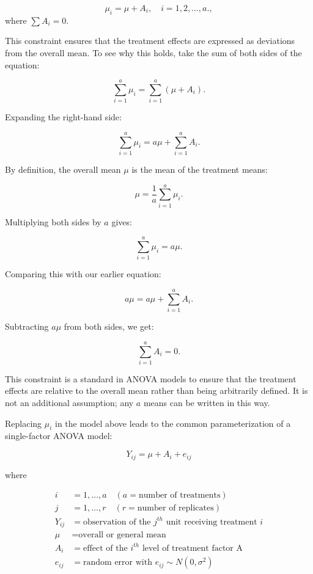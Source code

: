 \documentclass[
  letterpaper,
  DIV=11,
  numbers=noendperiod,
  oneside]{scrreprt}
\begin{document}
\[
\mu_i = \mu + A_i, \quad i = 1, 2, \dots, a.,
\] where \(\sum A_i = 0\).

\begin{tcolorbox}[enhanced jigsaw, colframe=quarto-callout-caution-color-frame, breakable, arc=.35mm, toptitle=1mm, colback=white, title={Why the \(\sum A_i = 0\) constraint?}, opacityback=0, bottomrule=.15mm, opacitybacktitle=0.6, colbacktitle=quarto-callout-caution-color!10!white, toprule=.15mm, rightrule=.15mm, bottomtitle=1mm, leftrule=.75mm, titlerule=0mm, coltitle=black, left=2mm]

This constraint ensures that the treatment effects are expressed as
deviations from the overall mean. To see why this holds, take the sum of
both sides of the equation:

\[
\sum_{i=1}^{a} \mu_i = \sum_{i=1}^{a} (\mu + A_i).
\]

Expanding the right-hand side:

\[
\sum_{i=1}^{a} \mu_i = a\mu + \sum_{i=1}^{a} A_i.
\]

By definition, the overall mean \(\mu\) is the mean of the treatment
means:

\[
\mu = \frac{1}{a} \sum_{i=1}^{a} \mu_i.
\]

Multiplying both sides by \(a\) gives:

\[
\sum_{i=1}^{a} \mu_i = a\mu.
\]

Comparing this with our earlier equation:

\[
a\mu = a\mu + \sum_{i=1}^{a} A_i.
\]

Subtracting \(a\mu\) from both sides, we get:

\[
\sum_{i=1}^{a} A_i = 0.
\]

This constraint is a standard in ANOVA models to ensure that the
treatment effects are relative to the overall mean rather than being
arbitrarily defined. It is not an additional assumption; any \(a\) means
can be written in this way.

\end{tcolorbox}

Replacing \(\mu_i\) in the model above leads to the common
parameterization of a single-factor ANOVA model:

\[
Y_{ij} = \mu + A_{i} + e_{ij}
\]

where

\begin{equation}
\begin{aligned}
i & = 1, \dots, a \quad (a = \text{number of treatments}) \\
j & = 1, \dots, r \quad (r = \text{number of replicates}) \\
Y_{ij} & = \text{observation of the } j^{th} \text{ unit receiving treatment } i \\
\mu & = \text{overall or general mean} \\
A_i & = \text{effect of the } i^{th} \text{ level of treatment factor A} \\
e_{ij} & = \text{random error with } e_{ij} \sim N(0, \sigma^2)
\end{aligned}
\end{equation}
\end{document}
